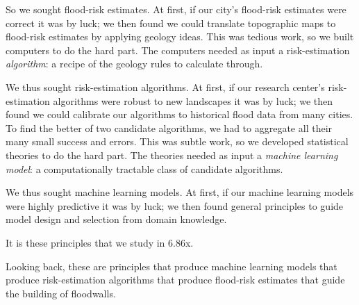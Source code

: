 \documentclass[11pt, justified]{tufte-book}
\theoremstyle{definition}
\begin{document}
        So we sought flood-risk estimates.  At first, if our city's flood-risk
        estimates were correct it was by luck; we then found we could translate
        topographic maps to flood-risk estimates by applying geology ideas.  This
        was tedious work, so we built computers to do the hard part.  The
        computers needed as input a risk-estimation \emph{algorithm}: a recipe of
        the geology rules to calculate through.

        We thus sought risk-estimation algorithms.  At first, if our research
        center's risk-estimation algorithms were robust to new landscapes it
        was by luck; we then found we could calibrate our algorithms to
        historical flood data from many cities.  To find the better of two
        candidate algorithms, we had to aggregate all their many small success
        and errors.  This was subtle work, so we developed statistical theories
        to do the hard part.  The theories needed as input a \emph{machine
        learning model}: a computationally tractable class of candidate
        algorithms.

        We thus sought machine learning models.  At first, if our machine
        learning models were highly predictive it was by luck; we then found
        general principles to guide model design and selection from domain
        knowledge. %

        It is these principles that we study in 6.86x.

        Looking back, these are principles that produce machine learning models
        that produce risk-estimation algorithms that produce flood-risk estimates
        that guide the building of floodwalls. 
\end{document}

